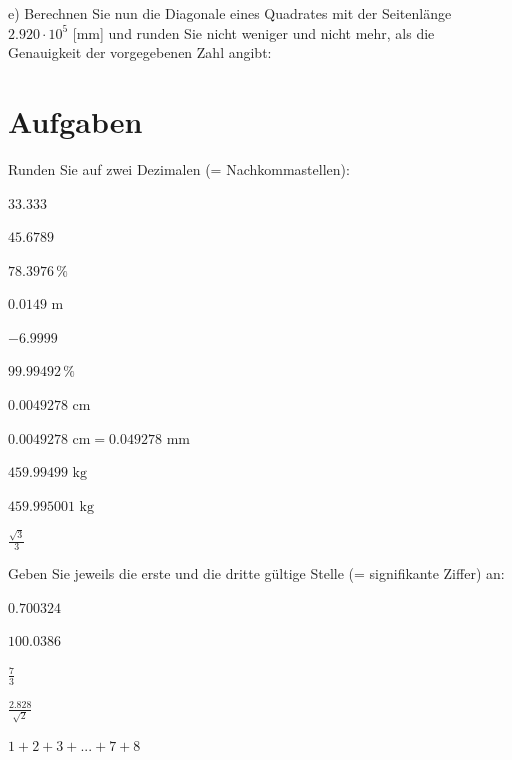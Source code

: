 e) Berechnen Sie nun die Diagonale eines Quadrates mit der Seitenlänge
$2.920\cdot{}10^{5}$ [mm] und runden Sie nicht weniger und nicht
mehr, als die Genauigkeit der vorgegebenen Zahl angibt:



\newpage
\section{Aufgaben}

Runden Sie auf zwei Dezimalen (= Nachkommastellen):
\begin{bbwAufgabenBlock}
\item $33.333$ 
\item $45.6789$ 
\item $78.3976\,\%$ 
\item $0.0149 \textrm{ m}$ 
\item $-6.9999$ 
\item $99.99492\,\%$ 
\item $0.0049278 \textrm{ cm}$ 
\item $0.0049278 \textrm{ cm} = 0.049278 \textrm{ mm}$ 
\item $459.99499  \textrm{ kg}$ 
\item $459.995001 \textrm{ kg}$ 
\item $\frac{\sqrt3}{3}$ 
\end{bbwAufgabenBlock}

\platzFuerBerechnungenBisEndeSeite{}



Geben Sie jeweils die erste und die dritte gültige Stelle (=
signifikante Ziffer) an:

\begin{bbwAufgabenBlock}
\item $0.700324$ 
\item $100.0386$ 
\item $\frac73$ 
\item $\frac{2.828}{\sqrt{2}}$ 
\item $1+2+3+...+7+8$ 
\end{bbwAufgabenBlock}

